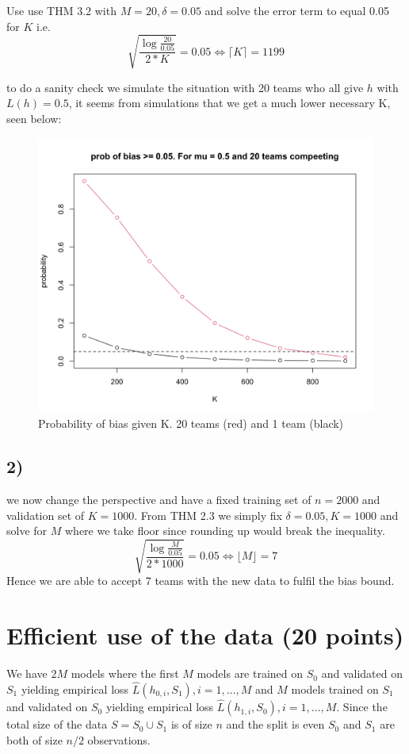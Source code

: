 \documentclass[a4paper,12pt]{article}
\begin{document}
Use use THM 3.2 with $M=20, \delta = 0.05$ and solve the error term to equal 0.05 for $K$ i.e.
$$
\sqrt{\frac{\log\frac{20}{0.05}}{2*K}} = 0.05 \Leftrightarrow \lceil K \rceil = 1199 
$$


to do a sanity check we simulate the situation with 20 teams who all give $h$ with $L(h) = 0.5$, it seems from simulations that we get a much lower necessary K, seen below:

\begin{figure}[htbp]
    \centering
    \includegraphics[width=0.5\linewidth]{1_1_b.png}
    \caption{Probability of bias given K. 20 teams (red) and 1 team (black)} %
    \label{fig:2}
\end{figure}

\newpage

\subsection*{2)}
we now change the perspective and have a fixed training set of $n = 2000$ and validation set of $K = 1000$.
From THM 2.3 we simply fix $\delta = 0.05, K = 1000$ and solve for $M$ where we take floor since rounding up would break the inequality.
$$
\sqrt{\frac{\log\frac{M}{0.05}}{2*1000}} = 0.05 \Leftrightarrow \lfloor M \rfloor = 7 
$$
Hence we are able to accept 7 teams with the new data to fulfil the bias bound.

\section{Efficient use of the data (20 points)}
We have $2M$ models where the first $M$ models are trained on $S_0$ and validated on $S_1$ yielding empirical loss $\hat{L}(h_{0,i}, S_1), i = 1,\dots,M$ and $M$ models trained on $S_1$ and validated on $S_0$ yielding empirical loss $\hat{L}(h_{1,i}, S_0), i = 1,\dots,M$. Since the total size of the data $S = S_0 \cup S_1$ is of size $n$ and the split is even $S_0$ and $S_1$ are both of size $n/2$ observations.
\end{document}
